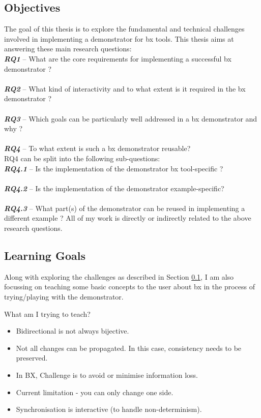 \subsection{Objectives}\label{subsec:objectives}
The goal of this thesis is to explore the fundamental and technical challenges involved in implementing a demonstrator for bx tools.
\newline\newline This thesis aims at answering these main research questions:
\\\textbf{\textit{RQ1}} -- What are the core requirements for implementing a successful bx demonstrator ?\\
\\\textbf{\textit{RQ2}} -- What kind of interactivity and to what extent is it required in the bx demonstrator ?\\
\\\textbf{\textit{RQ3}} -- Which goals can be particularly well addressed in a bx demonstrator and why ?\\
\\\textbf{\textit{RQ4}} -- To what extent is such a bx demonstrator reusable?\\
RQ4 can be split into the following sub-questions:
\\\textbf{\textit{RQ4.1}} -- Is the implementation of the demonstrator bx tool-specific ?\\
\\\textbf{\textit{RQ4.2}} -- Is the implementation of the demonstrator example-specific?\\
\\\textbf{\textit{RQ4.3}} -- What part(s) of the demonstrator can be reused in implementing a different example ?
\newline\newline All of my work is directly or indirectly related to the above research questions.

\subsection{Learning Goals}\label{subsec:learninggoals}
Along with exploring the challenges as described in Section \ref{subsec:objectives}, I am also focussing on teaching some basic concepts to the user about bx in the process of trying/playing with the demonstrator.

What am I trying to teach?
\begin{itemize} 
	\item {Bidirectional is not always bijective.} 
	\item {Not all changes can be propagated. In this case, consistency needs to be preserved.}
	\item {In BX, Challenge is to avoid or minimise information loss.}
	\item {Current limitation - you can only change one side.}
	\item {Synchronisation is interactive (to handle non-determinism).}	
\end{itemize}

